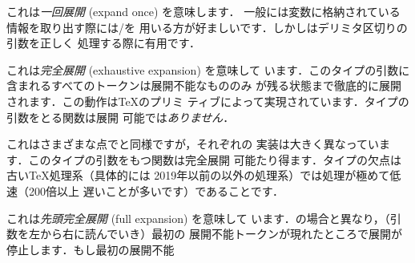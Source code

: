 \documentclass[uplatex,dvipdfmx,full,kernel]{wtpl3doc}
\begin{document}
\begin{description}[style=multiline, leftmargin=3zw]
  \item[\code{o}] これは\emph{一回展開} (expand once) を意味します．
    一般には変数に格納されている情報を取り出す際には/を
    用いる方が好ましいです．しかしはデリミタ区切りの引数を正しく
    処理する際に有用です．
%
  \item[\code{x}] これは\emph{完全展開} (exhaustive expansion) を意味して
    います．このタイプの引数に含まれるすべてのトークンは展開不能なもののみ
    が残る状態まで徹底的に展開されます．この動作は\TeX のプリミ
    ティブによって実現されています．タイプの引数をとる関数は展開
    可能では\emph{ありません}．
%
  \item[\code{e}] これはさまざまな点でと同様ですが，それぞれの
    実装は大きく異なっています．このタイプの引数をもつ関数は完全展開
    可能たり得ます．タイプの欠点は古い\TeX 処理系（具体的には
    2019年以前の\LuaTeX 以外の処理系）では処理が極めて低速（200倍以上
    遅いことが多いです）であることです．
%
  \item[\code{f}] これは\emph{先頭完全展開} (full expansion) を意味して
    います．の場合と異なり，（引数を左から右に読んでいき）最初の
    展開不能トークンが現れたところで展開が停止します．もし最初の展開不能

\end{description}
\end{document}
